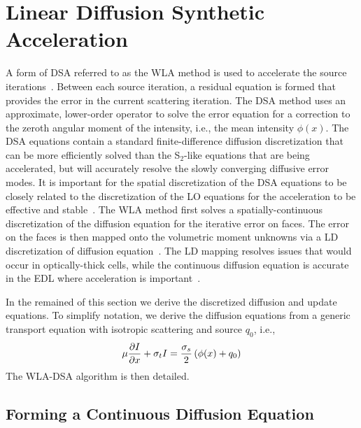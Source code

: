 \section{Linear Diffusion Synthetic Acceleration}

A form of DSA referred to as the WLA method is used to accelerate the source
iterations~\cite{wla,wla_thesis}. 
Between each source iteration, a residual equation is formed that provides 
the error in the current scattering iteration. The DSA method uses an approximate,
lower-order operator to solve the error equation for a correction to the zeroth angular moment of the
intensity, i.e., the mean intensity $\phi(x)$.  The DSA equations contain a standard
finite-difference diffusion discretization that can be more efficiently
solved than the S$_2$-like equations that are being accelerated, but will accurately resolve the
slowly converging diffusive error modes.  It is important for the spatial discretization of the DSA
equations to be closely related to the discretization of the LO equations for the
acceleration to be effective and stable~\cite{adams_dsa}.  The WLA method first solves a spatially-continuous
discretization of the diffusion equation
for the iterative error on faces.  The error on the faces is then mapped onto the
volumetric moment unknowns via a LD discretization of diffusion equation~\cite{wla}.
The LD mapping resolves issues that would occur in optically-thick cells, while the
continuous diffusion equation is accurate in the EDL where acceleration is important~\cite{adams_dsa}.

In the remained of this section we derive the discretized diffusion and update equations.  To simplify notation, we
derive the diffusion equations from a generic transport equation with isotropic scattering
and source $q_0$, i.e.,
\begin{equation}\label{eq:ss_trans}
    \mu \frac{\partial I}{\partial x} + \sigma_t I = \frac{\sigma_s}{2}\left( \phi(x) + q_0\right)
\end{equation}
The WLA-DSA algorithm is then detailed.

\subsection{Forming a Continuous Diffusion Equation}

